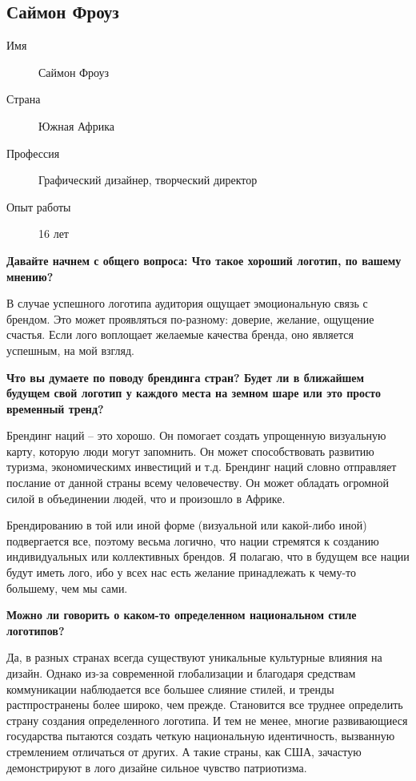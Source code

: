 \clearpage
\subsection{Саймон Фроуз}

\begin{description}
\item[Имя] Саймон Фроуз
\item[Страна] Южная Африка
\item[Профессия] Графический дизайнер, творческий директор
\item[Опыт работы] 16 лет
\end{description}

\textbf{Давайте начнем с общего вопроса: Что такое хороший логотип, по вашему мнению?}

В случае успешного логотипа аудитория ощущает эмоциональную связь с брендом. Это может проявляться по-разному: доверие, желание, ощущение счастья. Если лого воплощает желаемые качества бренда, оно является успешным, на мой взгляд.


\textbf{Что вы думаете по поводу брендинга стран? Будет ли в ближайшем будущем свой логотип у каждого места на земном шаре или это просто временный тренд?}

Брендинг наций – это хорошо. Он помогает создать упрощенную визуальную карту, которую люди могут запомнить. Он может способствовать развитию туризма, экономическимх инвестиций и т.д. Брендинг наций словно отправляет послание от данной страны всему человечеству. Он может обладать огромной силой в объединении людей, что и произошло в Африке.

Брендированию в той или иной форме (визуальной или какой-либо иной) подвергается все, поэтому весьма логично, что нации стремятся к созданию индивидуальных или коллективных брендов. Я полагаю, что в будущем все нации будут иметь лого, ибо у всех нас есть желание принадлежать к чему-то большему, чем мы сами. 


\textbf{Можно ли говорить о каком-то определенном национальном стиле логотипов?}

Да, в разных странах всегда существуют уникальные культурные влияния на дизайн. Однако из-за современной глобализации и благодаря средствам коммуникации наблюдается все большее слияние стилей, и тренды растпространены более широко, чем прежде. Становится все труднее определить страну создания определенного логотипа. И тем не менее, многие развивающиеся государства пытаются создать четкую национальную идентичность, вызванную стремлением отличаться от других. А такие страны, как США, зачастую демонстрируют в лого дизайне  сильное чувство патриотизма. 


